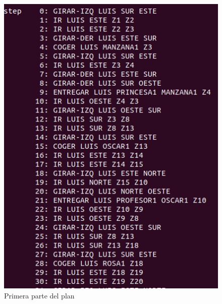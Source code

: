 \begin{figure}[H]
	\begin{minipage}[b]{0.5\linewidth}
		\centering
		\includegraphics[width=\linewidth]{ej2-1.png}
		\caption{Primera parte del plan}
		\label{fig:ej2-1}
	\end{minipage}
	\hspace{0.5cm}
	\begin{minipage}[b]{0.5\linewidth}
		\centering

\end{minipage}
\end{figure}
